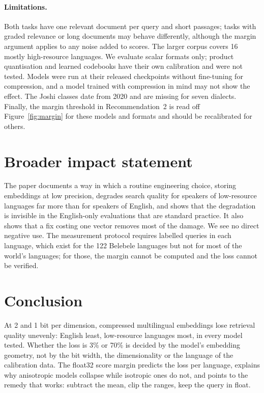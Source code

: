 \documentclass[10pt]{article}
\begin{document}
\paragraph{Limitations.} Both tasks have one relevant document per query and short passages; tasks with graded relevance or long documents may behave differently, although the margin argument applies to any noise added to scores. The larger corpus covers 16 mostly high-resource languages. We evaluate scalar formats only; product quantisation and learned codebooks have their own calibration and were not tested. Models were run at their released checkpoints without fine-tuning for compression, and a model trained with compression in mind may not show the effect. The Joshi classes date from 2020 and are missing for seven dialects. Finally, the margin threshold in Recommendation~2 is read off Figure~\ref{fig:margin} for these models and formats and should be recalibrated for others.

\section{Broader impact statement}
The paper documents a way in which a routine engineering choice, storing embeddings at low precision, degrades search quality for speakers of low-resource languages far more than for speakers of English, and shows that the degradation is invisible in the English-only evaluations that are standard practice. It also shows that a fix costing one vector removes most of the damage. We see no direct negative use. The measurement protocol requires labelled queries in each language, which exist for the 122 Belebele languages but not for most of the world's languages; for those, the margin cannot be computed and the loss cannot be verified.

\section{Conclusion}
At 2 and 1 bit per dimension, compressed multilingual embeddings lose retrieval quality unevenly: English least, low-resource languages most, in every model tested. Whether the loss is 3\% or 70\% is decided by the model's embedding geometry, not by the bit width, the dimensionality or the language of the calibration data. The float32 score margin predicts the loss per language, explains why anisotropic models collapse while isotropic ones do not, and points to the remedy that works: subtract the mean, clip the ranges, keep the query in float.
\end{document}
